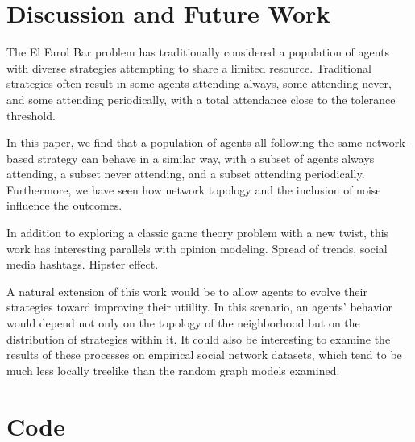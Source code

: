 \documentclass[12pt]{article}
\begin{document}
\section{Discussion and Future Work}

The El Farol Bar problem has traditionally considered a population of agents with diverse strategies attempting to share a limited resource.  Traditional strategies often result in some agents attending always, some attending never, and some attending periodically, with a total attendance close to the tolerance threshold.

In this paper, we find that a population of agents all following the same network-based strategy can behave in a similar way, with a subset of agents always attending, a subset never attending, and a subset attending periodically.  Furthermore, we have seen how network topology and the inclusion of noise influence the outcomes.

In addition to exploring a classic game theory problem with a new twist, this work has interesting parallels with opinion modeling.  Spread of trends, social media hashtags.  Hipster effect.

A natural extension of this work would be to allow agents to evolve their strategies toward improving their utiility.  In this scenario, an agents' behavior would depend not only on the topology of the neighborhood but on the distribution of strategies within it.  It could also be interesting to examine the results of these processes on empirical social network datasets, which tend to be much less locally treelike than the random graph models examined.    

\section*{Code}
\end{document}
